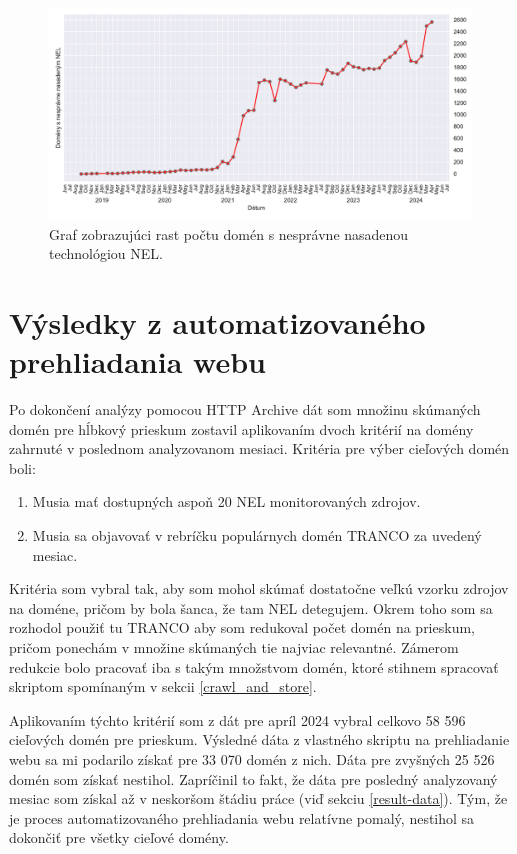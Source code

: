 \begin{figure}[!htb]
\begin{center}
 \includegraphics[scale=0.59]{obrazky-figures/httparchive_nel_deployment_incorrect.pdf}
 \caption{Graf zobrazujúci rast počtu domén s nesprávne nasadenou technológiou NEL.}
 \label{fig:httparchive-nel-deployment-incorrect}
\end{center}
\end{figure}

\pagebreak


\section{Výsledky z automatizovaného prehliadania webu}
\label{crawling-results}

Po dokončení analýzy pomocou HTTP Archive dát som množinu skúmaných domén pre hĺbkový prieskum zostavil aplikovaním dvoch kritérií na domény zahrnuté v poslednom analyzovanom mesiaci. 
Kritéria pre výber cieľových domén boli:
\begin{enumerate}
    \item Musia mať dostupných aspoň 20 NEL monitorovaných zdrojov.
    \item Musia sa objavovať v rebríčku populárnych domén TRANCO za uvedený mesiac.
\end{enumerate}
Kritéria som vybral tak, aby som mohol skúmať dostatočne veľkú vzorku zdrojov na doméne, pričom by bola šanca, že tam NEL detegujem.
Okrem toho som sa rozhodol použiť tu TRANCO aby som redukoval počet domén na prieskum, pričom ponechám v množine skúmaných tie najviac relevantné.
Zámerom redukcie bolo pracovať iba s takým množstvom domén, ktoré stihnem spracovať skriptom spomínaným v sekcii \ref{crawl_and_store}.

Aplikovaním týchto kritérií som z dát pre apríl 2024 vybral celkovo 58 596 cieľových domén pre prieskum. 
Výsledné dáta z vlastného skriptu na prehliadanie webu sa mi podarilo získať pre 33 070 domén z nich. 
Dáta pre zvyšných 25 526 domén som získať nestihol.
Zapríčinil to fakt, že dáta pre posledný analyzovaný mesiac som získal až v neskoršom štádiu práce (viď sekciu \ref{result-data}).
Tým, že je proces automatizovaného prehliadania webu relatívne pomalý, nestihol sa dokončiť pre všetky cieľové domény.

